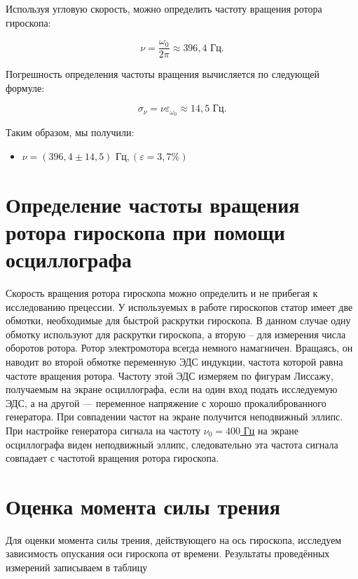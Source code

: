 \documentclass[a4paper,12pt]{article} %
\begin{document}
Используя угловую скорость, можно определить частоту вращения ротора гироскопа:

\begin{equation}
\nu = \frac{\omega_0}{2\pi} \approx 396,4 \text{ Гц}.
\end{equation}

Погрешность определения частоты вращения вычисляется по следующей формуле:

\begin{equation}
\sigma_\nu = \nu \varepsilon_{\omega_0} \approx 14,5 \text{ Гц}.
\end{equation}

Таким образом, мы получили:

\begin{itemize}
	\item \underline{$ \nu = \left( 396,4 \pm 14,5 \right) \text{ Гц}, \left( \varepsilon = 3,7 \% \right)   $}
\end{itemize}

\section{Определение частоты вращения ротора гироскопа при помощи осциллографа}

Скорость вращения ротора гироскопа можно определить и не прибегая к исследованию прецессии. У используемых в работе гироскопов статор имеет две обмотки, необходимые для быстрой раскрутки гироскопа. В данном случае одну обмотку используют для раскрутки гироскопа, а вторую -- для измерения числа оборотов ротора. Ротор электромотора всегда немного намагничен. Вращаясь, он наводит во второй обмотке переменную ЭДС индукции, частота которой равна частоте вращения ротора. Частоту этой ЭДС измеряем по фигурам Лиссажу, получаемым на экране осциллографа, если на один вход подать исследуемую ЭДС, а на другой — переменное напряжение с хорошо прокалиброванного генератора. При совпадении частот на экране получится неподвижный эллипс.\\
При настройке генератора сигнала на частоту \underline{$ \nu_0 = 400$ Гц} на экране осциллографа виден  неподвижный эллипс, следовательно эта частота сигнала совпадает с частотой вращения ротора гироскопа.

\section{Оценка момента силы трения}

Для оценки момента силы трения, действующего на ось гироскопа, исследуем зависимость опускания оси гироскопа от времени. Результаты проведённых измерений записываем в таблицу 
\end{document}
